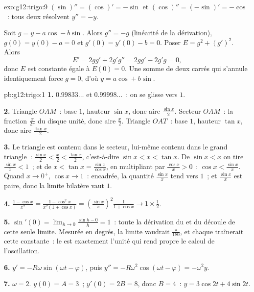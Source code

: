 \begin{solution}{exo:g12:trigo:9}
$(\sin)'' = (\cos)' = -\sin$ et $(\cos)'' = (-\sin)' = -\cos$~: tous deux
résolvent $y'' = -y$.

Soit $g = y - a\cos - b\sin$. Alors $g'' = -g$ (linéarité de la
dérivation), $g(0) = y(0) - a = 0$ et $g'(0) = y'(0) - b = 0$. Poser
$E = g^2 + (g')^2$. Alors
\[
E' = 2g g' + 2g' g'' = 2g g' - 2g' g = 0,
\]
donc $E$ est constante égale à $E(0) = 0$. Une somme de deux carrés qui
s'annule identiquement force $g = 0$, d'où $y = a\cos + b\sin$.
\end{solution}

\begin{solution}{pb:g12:trigo:1}
\textbf{1.} $0.99833\ldots$ et $0.99998\ldots$~: on se glisse vers
$1$.

\textbf{2.} Triangle $OAM$~: base $1$, hauteur $\sin x$, donc aire
$\frac{\sin x}{2}$. Secteur $OAM$~: la fraction $\frac{x}{2\pi}$ du
disque unité, donc aire $\frac x2$. Triangle $OAT$~: base $1$,
hauteur $\tan x$, donc aire $\frac{\tan x}{2}$.

\textbf{3.} Le triangle est contenu dans le secteur, lui-même
contenu dans le grand triangle~:
$\frac{\sin x}{2} < \frac x2 < \frac{\tan x}{2}$, c'est-à-dire
$\sin x < x < \tan x$. De $\sin x < x$ on tire
$\frac{\sin x}{x} < 1$~; et de
$x < \tan x = \frac{\sin x}{\cos x}$, en multipliant par
$\frac{\cos x}{x} > 0$~: $\cos x < \frac{\sin x}{x}$. Quand
$x \to 0^+$, $\cos x \to 1$~: encadrée, la quantité
$\frac{\sin x}{x}$ tend vers $1$~; et $\frac{\sin x}{x}$ est paire,
donc la limite bilatère vaut $1$.

\textbf{4.} $\frac{1 - \cos x}{x^2} =
\frac{1 - \cos^2 x}{x^2 (1 + \cos x)} =
\left(\frac{\sin x}{x}\right)^2 \frac{1}{1 + \cos x}
\to 1 \times \frac12$.

\textbf{5.} $\sin'(0) = \lim_{h \to 0} \frac{\sin h - 0}{h} = 1$~:
toute la dérivation du  et du  découle de cette seule
limite. Mesurée en degrés, la limite vaudrait $\frac{\pi}{180}$, et
chaque  traînerait cette constante~: le  est
exactement l'unité qui rend propre le calcul de l'oscillation.

\textbf{6.} $y' = -R\omega\sin(\omega t - \varphi)$, puis
$y'' = -R\omega^2\cos(\omega t - \varphi) = -\omega^2 y$.

\textbf{7.} $\omega = 2$. $y(0) = A = 3$~; $y'(0) = 2B = 8$, donc
$B = 4$~: $y = 3\cos 2t + 4\sin 2t$.


\end{solution}

